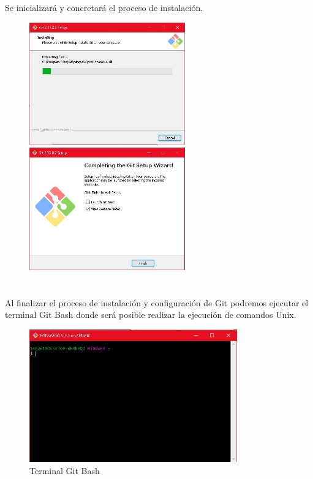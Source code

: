 \documentclass[10pt,a4paper]{article} %
\begin{document}
\begin{enumerate}
{			\pagebreak
			\item Se inicializar{\' a} y concretar{\' a} el proceso de instalaci{\' o}n.
			\begin{figure}[H]
				\includegraphics[width=0.6\textwidth]{19.jpg}
				\centering
				\label{img:paso19_1}
				\includegraphics[width=0.6\textwidth]{19_2.jpg}
				\centering
				\label{img:paso19_2}
			\end{figure}
		}
	\end{enumerate}
	
	\pagebreak
	
	\section{\color{colorIPN}{Resultados}}
	{\large Al finalizar el proceso de instalaci{\' o}n y configuraci{\' o}n de Git podremos ejecutar el terminal Git Bash donde ser{\' a} posible realizar la ejecuci{\' o}n de comandos Unix.}
	
	\begin{figure}[H]
		\includegraphics[width=0.8\textwidth]{resultado.jpg}
		\centering
		\caption{Terminal Git Bash}
		\label{img:resultado}
	\end{figure}  \hfill
	
\end{document}
